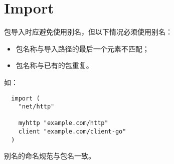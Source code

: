 \chapter{Import}
包导入时应避免使用别名，但以下情况必须使用别名：
\begin{itemize}[leftmargin=4em]
\item 包名称与导入路径的最后一个元素不匹配；
\item 包名称与已有的包重复。
\end{itemize}

如：
\begin{verbatim}
  import (
  	"net/http"

  	myhttp "example.com/http"
  	client "example.com/client-go"
  )
\end{verbatim}

别名的命名规范与包名一致。
